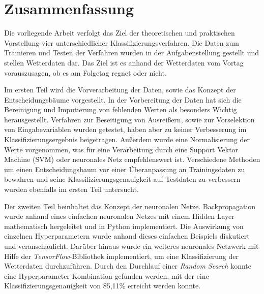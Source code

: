 \pagebreak
\section*{Zusammenfassung}
Die vorliegende Arbeit verfolgt das Ziel der theoretischen und praktischen Vorstellung vier unterschiedlicher Klassifizierungsverfahren. Die Daten zum Trainieren und Testen der Verfahren wurden in der Aufgabenstellung gestellt und stellen Wetterdaten dar. Das Ziel ist es anhand der Wetterdaten vom Vortag vorauszusagen, ob es am Folgetag regnet oder nicht.

\noindent \hspace*{7mm}
Im ersten Teil wird die Vorverarbeitung der Daten, sowie das Konzept der Entscheidungsbäume vorgestellt. In der Vorbereitung der Daten hat sich die Bereinigung und Imputierung von fehlenden Werten als besonders Wichtig herausgestellt. Verfahren zur Beseitigung von Ausreißern, sowie zur Vorselektion von Eingabevariablen wurden getestet, haben aber zu keiner Verbesserung im Klassifizierungsergebnis beigetragen. Außerdem wurde eine Normalisierung der Werte vorgenommen, was für eine Verarbeitung durch eine Support Vektor Machine (SVM) oder neuronales Netz empfehlenswert ist. Verschiedene Methoden um einen Entscheidungsbaum vor einer Überanpassung an Trainingsdaten zu bewahren und seine Klassifizierungsgenauigkeit auf Testdaten zu verbessern wurden ebenfalls im ersten Teil untersucht.

\noindent \hspace*{7mm}
Der zweiten Teil beinhaltet das Konzept der neuronalen Netze. Backpropagation wurde anhand eines einfachen neuronalen Netzes mit einem Hidden Layer mathematisch hergeleitet und in Python implementiert. Die Auswirkung von einzelnen Hyperparametern wurde anhand dieses einfachen Beispiels diskutiert und veranschaulicht. Darüber hinaus wurde ein weiteres neuronales Netzwerk mit Hilfe der \emph{TensorFlow}-Bibliothek implementiert, um eine Klassifizierung der Wetterdaten durchzuführen. Durch den Durchlauf einer \emph{Random Search} konnte eine Hyperparameter-Kombination gefunden werden, mit der eine Klassifizierungsgenauigkeit von 85,11\% erreicht werden konnte.

